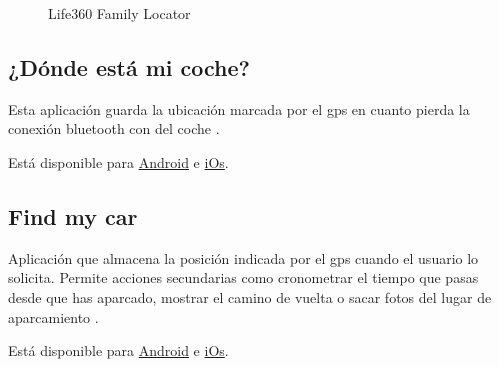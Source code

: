 \begin{figure}[h!btp]
	\begin{adjustbox}{minipage=\linewidth, fbox}
		\centering
		\hspace{10mm}
	\end{adjustbox}
\caption{Life360 Family Locator}
	\label{fig:life360}
\end{figure}

\subsection{¿Dónde está mi coche?}
Esta aplicación guarda la ubicación marcada por el gps en cuanto pierda la conexión bluetooth con del coche \cite{Unk14}.

Está disponible para \href{https://play.google.com/store/apps/details?id=com.whereismycar&hl=es}{Android} e \href{https://itunes.apple.com/es/app/donde-esta-mi-coche/id504186557?mt=8}{iOs}.

\subsection{Find my car}
Aplicación que almacena la posición indicada por el gps cuando el usuario lo solicita. Permite acciones secundarias como cronometrar el tiempo que pasas desde que has aparcado, mostrar el camino de vuelta o sacar fotos del lugar de aparcamiento \cite{Unk14}.

Está disponible para \href{https://play.google.com/store/apps/details?id=com.elibera.android.findmycar&hl=es}{Android} e \href{https://itunes.apple.com/us/app/find-my-car/id349510601?mt=8}{iOs}.

